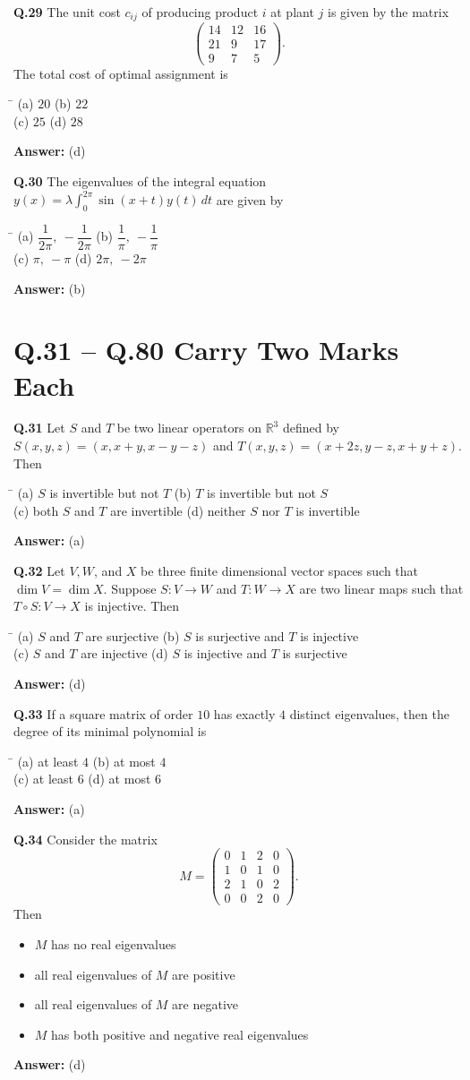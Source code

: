 \documentclass[11pt,a4paper]{article}
\newcommand{\optsfour}[4]{%
  \begin{tabbing}
    \hspace{0.48\linewidth}\=\kill
    (a) #1 \> (b) #2 \\[2pt]
    (c) #3 \> (d) #4
  \end{tabbing}%
}
\newcommand{\optslist}[4]{%
  \begin{itemize}
    \setlength{\itemsep}{2pt}\setlength{\parskip}{0pt}
    \item[(a)] #1
    \item[(b)] #2
    \item[(c)] #3
    \item[(d)] #4
  \end{itemize}%
}
\newcommand{\ans}[1]{\textbf{Answer:} #1\par\medskip}
\begin{document}
\textbf{Q.29} The unit cost $c_{ij}$ of producing product $i$ at plant $j$ is given by the matrix
\[
  \begin{pmatrix}
    14 & 12 & 16 \\
    21 & 9 & 17 \\
    9 & 7 & 5
  \end{pmatrix}.
\]
The total cost of optimal assignment is
\optsfour{$20$}{$22$}{$25$}{$28$}
\ans{(d)}

\textbf{Q.30} The eigenvalues of the integral equation $y(x) = \lambda \displaystyle\int_0^{2\pi} \sin(x + t)y(t)\,dt$ are given by
\optsfour{$\dfrac{1}{2\pi},\ -\dfrac{1}{2\pi}$}{$\dfrac{1}{\pi},\ -\dfrac{1}{\pi}$}{$\pi,\ -\pi$}{$2\pi,\ -2\pi$}
\ans{(b)}

\section*{Q.31 -- Q.80 Carry Two Marks Each}

\textbf{Q.31} Let $S$ and $T$ be two linear operators on $\mathbb{R}^3$ defined by $S(x,y,z) = (x, x+y, x-y-z)$ and $T(x,y,z) = (x+2z, y-z, x+y+z)$. Then
\optsfour{$S$ is invertible but not $T$}{$T$ is invertible but not $S$}{both $S$ and $T$ are invertible}{neither $S$ nor $T$ is invertible}
\ans{(a)}

\textbf{Q.32} Let $V, W$, and $X$ be three finite dimensional vector spaces such that $\dim V = \dim X$. Suppose $S : V \to W$ and $T : W \to X$ are two linear maps such that $T \circ S : V \to X$ is injective. Then
\optsfour{$S$ and $T$ are surjective}{$S$ is surjective and $T$ is injective}{$S$ and $T$ are injective}{$S$ is injective and $T$ is surjective}
\ans{(d)}

\textbf{Q.33} If a square matrix of order $10$ has exactly $4$ distinct eigenvalues, then the degree of its minimal polynomial is
\optsfour{at least $4$}{at most $4$}{at least $6$}{at most $6$}
\ans{(a)}

\textbf{Q.34} Consider the matrix
\[
  M = \begin{pmatrix}
    0 & 1 & 2 & 0 \\
    1 & 0 & 1 & 0 \\
    2 & 1 & 0 & 2 \\
    0 & 0 & 2 & 0
  \end{pmatrix}.
\]
Then
\optslist{$M$ has no real eigenvalues}{all real eigenvalues of $M$ are positive}{all real eigenvalues of $M$ are negative}{$M$ has both positive and negative real eigenvalues}
\ans{(d)}
\end{document}
